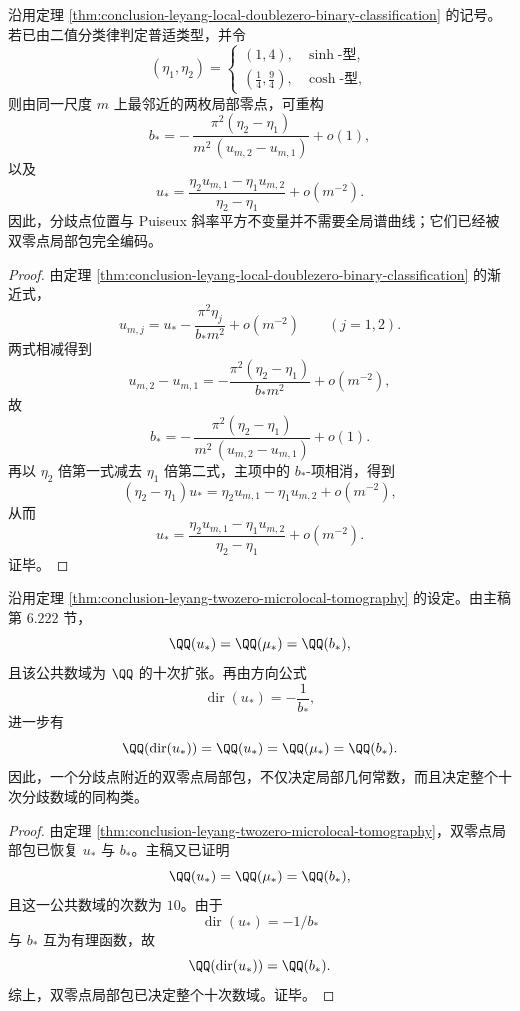 \begin{theorem}\label{thm:conclusion-leyang-twozero-microlocal-tomography}
沿用定理 \ref{thm:conclusion-leyang-local-doublezero-binary-classification} 的记号。若已由二值分类律判定普适类型，并令
\[
(\eta_1,\eta_2)=
\begin{cases}
(1,4),& \sinh\text{-型},\\[2mm]
(\tfrac14,\tfrac94),& \cosh\text{-型},
\end{cases}
\]
则由同一尺度 \(m\) 上最邻近的两枚局部零点，可重构
\[
b_\ast
=
-\,\frac{\pi^2(\eta_2-\eta_1)}{m^2\,(u_{m,2}-u_{m,1})}+o(1),
\]
以及
\[
u_\ast=
\frac{\eta_2u_{m,1}-\eta_1u_{m,2}}{\eta_2-\eta_1}+o(m^{-2}).
\]
因此，分歧点位置与 Puiseux 斜率平方不变量并不需要全局谱曲线；它们已经被双零点局部包完全编码。
\end{theorem}
\begin{proof}
由定理 \ref{thm:conclusion-leyang-local-doublezero-binary-classification} 的渐近式，
\[
u_{m,j}
=
u_\ast-\frac{\pi^2\eta_j}{b_\ast m^2}+o(m^{-2})
\qquad (j=1,2).
\]
两式相减得到
\[
u_{m,2}-u_{m,1}
=
-\frac{\pi^2(\eta_2-\eta_1)}{b_\ast m^2}+o(m^{-2}),
\]
故
\[
b_\ast
=
-\,\frac{\pi^2(\eta_2-\eta_1)}{m^2\,(u_{m,2}-u_{m,1})}+o(1).
\]
再以 \(\eta_2\) 倍第一式减去 \(\eta_1\) 倍第二式，主项中的 \(b_\ast\)-项相消，得到
\[
(\eta_2-\eta_1)u_\ast
=
\eta_2u_{m,1}-\eta_1u_{m,2}+o(m^{-2}),
\]
从而
\[
u_\ast=
\frac{\eta_2u_{m,1}-\eta_1u_{m,2}}{\eta_2-\eta_1}+o(m^{-2}).
\]
证毕。
\end{proof}

\begin{corollary}[局部零包决定整个十次数域]\label{cor:conclusion-leyang-local-doublezero-recovers-decic-field}
沿用定理 \ref{thm:conclusion-leyang-twozero-microlocal-tomography} 的设定。由主稿第 \(6.222\) 节，
\[
\QQ(u_\ast)=\QQ(\mu_\ast)=\QQ(b_\ast),
\]
且该公共数域为 \(\QQ\) 的十次扩张。再由方向公式
\[
\operatorname{dir}(u_\ast)=-\frac{1}{b_\ast},
\]
进一步有
\[
\QQ(\operatorname{dir}(u_\ast))
=
\QQ(u_\ast)
=
\QQ(\mu_\ast)
=
\QQ(b_\ast).
\]
因此，一个分歧点附近的双零点局部包，不仅决定局部几何常数，而且决定整个十次分歧数域的同构类。
\end{corollary}
\begin{proof}
由定理 \ref{thm:conclusion-leyang-twozero-microlocal-tomography}，双零点局部包已恢复 \(u_\ast\) 与 \(b_\ast\)。主稿又已证明
\[
\QQ(u_\ast)=\QQ(\mu_\ast)=\QQ(b_\ast),
\]
且这一公共数域的次数为 \(10\)。由于
\[
\operatorname{dir}(u_\ast)=-1/b_\ast
\]
与 \(b_\ast\) 互为有理函数，故
\[
\QQ(\operatorname{dir}(u_\ast))=\QQ(b_\ast).
\]
综上，双零点局部包已决定整个十次数域。证毕。
\end{proof}

